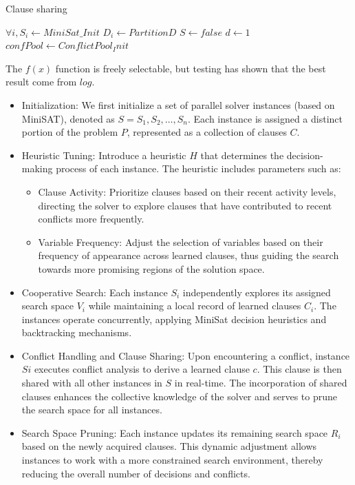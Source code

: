 \documentclass{article}
\begin{document}
\begin{algorithm}
\caption{Clause sharing}\label{alg:cap}
 $\forall i, S_i \gets MiniSat\_Init$ \;
 $D_i \gets Partition D$\;
 $S \gets false$\;
 $d \gets 1$
 $confPool \gets ConflictPool_Init$\;
\end{algorithm}

The $f(x)$ function is freely selectable, but testing has shown that the best result come from $log$.

\begin{itemize}
    \item Initialization: We first initialize a set of parallel solver instances (based on MiniSAT), denoted as $S = {S_1,S_2,…,S_n}$. Each instance is assigned a distinct portion of the problem $P$, represented as a collection of clauses $C$.
    \item Heuristic Tuning: Introduce a heuristic $H$ that determines the decision-making process of each instance. The heuristic includes parameters such as:
    \begin{itemize}
        \item Clause Activity: Prioritize clauses based on their recent activity levels, directing the solver to explore clauses that have contributed to recent conflicts more frequently.
        \item Variable Frequency: Adjust the selection of variables based on their frequency of appearance across learned clauses, thus guiding the search towards more promising regions of the solution space.
    \end{itemize}
    \item Cooperative Search: Each instance $S_i$ independently explores its assigned search space $V_i$ while maintaining a local record of learned clauses $C_i$. The instances operate concurrently, applying MiniSat decision heuristics and backtracking mechanisms.
    \item Conflict Handling and Clause Sharing: Upon encountering a conflict, instance $Si$ executes conflict analysis to derive a learned clause $c$. This clause is then shared with all other instances in $S$ in real-time.
    The incorporation of shared clauses enhances the collective knowledge of the solver and serves to prune the search space for all instances.
    \item Search Space Pruning: Each instance updates its remaining search space $R_i$ based on the newly acquired clauses. This dynamic adjustment allows instances to work with a more constrained search environment, thereby reducing the overall number of decisions and conflicts.


\end{itemize}
\end{document}

